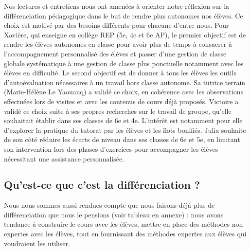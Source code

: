 Nos lectures et entretiens nous ont amenées à orienter notre réflexion sur la différenciation pédagogique dans le but de rendre plus autonomes nos élèves. Ce choix est motivé par des besoins différents pour chacune d’entre nous. Pour Xavière, qui enseigne en collège REP (5e, 4e et 6e AP),  le premier objectif est de rendre les élèves autonomes en classe pour avoir plus de temps à consacrer à l’accompagnement personnalisé des élèves et passer d’une gestion de classe globale systématique à une gestion de classe plus ponctuelle notamment avec les élèves en difficulté. Le second objectif est de donner à tous les élèves les outils d’autoévaluation nécessaires à un travail hors classe autonome. Sa tutrice terrain (Marie-Hélène Le Yaouanq) a validé ce choix, en cohérence avec les observations effectuées lors de visites et avec les contenus de cours déjà proposés. Victoire a validé ce choix suite à ses propres recherches sur le travail de groupe, qu’elle souhaitait établir dans ses classes de 6e et 4e. L’intérêt est notamment pour elle d’explorer la pratique du tutorat par les élèves et les îlots bonifiés. Julia souhaite de son côté réduire les écarts de niveau dans ses classes de 6e et 5e, en limitant son intervention lors des phases d’exercices pour accompagner les élèves nécessitant une assistance personnalisée.

\subsection{Qu'est-ce que c'est la différenciation ?}


Nous nous sommes aussi rendues compte que nous faisons déjà plus de différenciation que nous le pensions (voir tableau en annexe) : nous avons tendance à construire le cours avec les élèves, mettre en place des méthodes non expertes avec les élèves, tout en fournissant des méthodes expertes aux élèves qui voudraient les utiliser.




